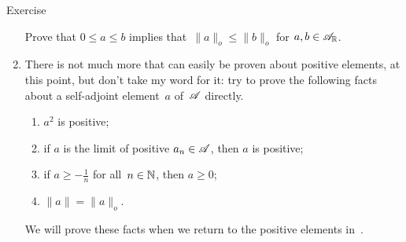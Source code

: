 \documentclass[a]{subfiles}
\begin{document}
\begin{parsec}
\begin{point}{Exercise}
\begin{enumerate}
Prove that $0\leq a\leq b$ implies that~$\|a\|_o\leq\|b\|_o$
for $a,b\in\mathscr{A}_{\mathbb{R}}$.

\item
There is not much more that can easily be
proven about positive elements, at this point,
but don't take my word for it:
try to prove the following facts
about a self-adjoint element~$a$ of~$\mathscr{A}$ directly.
\begin{enumerate}
\item $a^2$ is positive;
\item if $a$ is the limit of positive $a_n\in\mathscr{A}$,
then $a$ is positive;
\item if $a\geq -\frac{1}{n}$ for all~$n\in \mathbb{N}$, then $a\geq 0$;
\item  $\|a\|=\|a\|_o$.
\end{enumerate}
We will prove these facts
when we return to the positive elements in~.
\end{enumerate}
\end{point}
\end{parsec}
\end{document}
